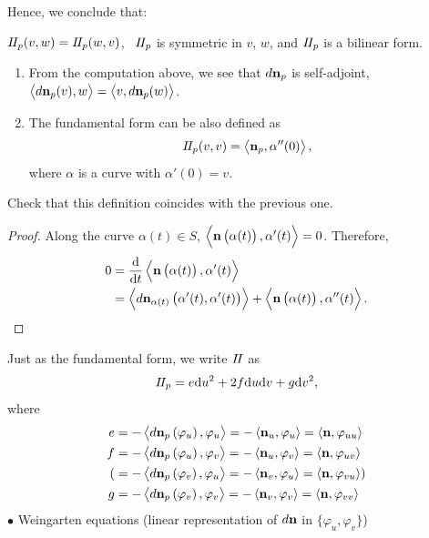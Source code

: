 Hence, we conclude that: 
\begin{theorem}
    \(I\!I_p(v,w)=I\!I_p(w,v)\), \ie\ 
    \(I\!I_p\) is symmetric in \(v\), \(w\), and
    \(I\!I_p\) is a bilinear form. 
\end{theorem}
\begin{remark}
    \hfill
    \begin{enumerate}[(1)]
        \item From the computation above, we see that 
        \(d \vb{n}_p\) is self-adjoint, \ie\ 
        \(\left\langle d \vb{n}_p(v),w\right\rangle=
        \left\langle v, d \vb{n}_p(w)\right\rangle
        \).
        \item The  fundamental form can be also 
        defined as 
        \[I\!I_p(v,v)=\left\langle\vb{n}_p,\alpha''(0)\right\rangle,\]
        where \(\alpha\) is a curve with \(\alpha'(0)=v\).
    \end{enumerate}
\end{remark}
\begin{exercise}
    Check that this definition coincides with the previous one.
\end{exercise}
\begin{proof}
    Along the curve \(\alpha(t)\in S\), \(\left\langle
    \vb{n}\left(\alpha(t)\right),\alpha'(t)\right\rangle=0\).
    Therefore, 
    \begin{align*}
        0&=\dv{t}\left\langle\vb{n}\left(\alpha(t)\right),\alpha'(t)
        \right\rangle\\
        &= \left\langle d\vb{n}_{\alpha(t)}\left(\alpha'(t)
        ,\alpha'(t)\right)\right\rangle+\left\langle
         \vb{n}\left(\alpha(t)\right),\alpha''(t)\right\rangle.
    \end{align*}
\end{proof}
Just as the  fundamental form, we write \(I\!I\) as 
\[
    I\!I_p=e\dd u^2+2f\dd u\dd v+g\dd v^2,
\]
where 
\begin{align*}
    e&=-\left\langle d\vb{n}_p\left(\varphi_u\right),\varphi_u\right\rangle
    =-\left\langle\vb{n}_u,\varphi_u\right\rangle=\left\langle
        \vb{n},\varphi_{uu}\right\rangle\\
    f&=-\left\langle d\vb{n}_p\left(\varphi_u\right),\varphi_v\right\rangle
    =-\left\langle\vb{n}_u,\varphi_v\right\rangle=\left\langle
        \vb{n},\varphi_{uv}\right\rangle\\
        (&=-\left\langle d\vb{n}_p\left(\varphi_v\right),\varphi_u
        \right\rangle=-\left\langle\vb{n}_v,\varphi_u\right\rangle
        =\left\langle\vb{n},\varphi_{vu}\right\rangle)\\
        g&=-\left\langle d\vb{n}_p\left(\varphi_v\right),\varphi_v
        \right\rangle=-\left\langle\vb{n}_v,\varphi_v
        \right\rangle=\left\langle\vb{n},\varphi_{vv}\right\rangle
\end{align*}
\(\bullet\) Weingarten equations (linear representation of \(d\vb{n}\)
in \(\{\varphi_u,\varphi_v\}\))

